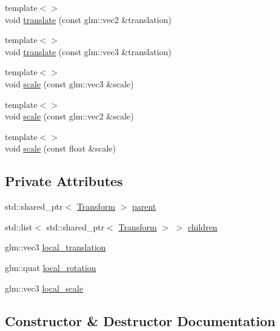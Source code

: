 \begin{DoxyCompactItemize}
{\footnotesize template$<$$>$ }\\void \hyperlink{class_transform_aa32a94ec80690e270a849b0ae0fd9230}{translate} (const glm\+::vec2 \&translation)
\item 
{\footnotesize template$<$$>$ }\\void \hyperlink{class_transform_af72de2343b28c920935e085a369618f7}{translate} (const glm\+::vec3 \&translation)
\item 
{\footnotesize template$<$$>$ }\\void \hyperlink{class_transform_a80a0d4e1e53facf0576af6c7c0d7b3fe}{scale} (const glm\+::vec3 \&scale)
\item 
{\footnotesize template$<$$>$ }\\void \hyperlink{class_transform_ae246427e89c5a775fbb4981078410e29}{scale} (const glm\+::vec2 \&scale)
\item 
{\footnotesize template$<$$>$ }\\void \hyperlink{class_transform_a602ccc5ef9e53683bb7b9c6a4580f680}{scale} (const float \&scale)
\end{DoxyCompactItemize}
\subsection*{Private Attributes}
\begin{DoxyCompactItemize}
\item 
std\+::shared\+\_\+ptr$<$ \hyperlink{class_transform}{Transform} $>$ \hyperlink{class_transform_a71f8820c3ef3bd92f681bc92d200548f}{parent}
\item 
std\+::list$<$ std\+::shared\+\_\+ptr$<$ \hyperlink{class_transform}{Transform} $>$ $>$ \hyperlink{class_transform_a22f8ebd97bc4ab75e133d0490d88e240}{children}
\item 
glm\+::vec3 \hyperlink{class_transform_a9cab8178cfc03757f96fb805d3725a2f}{local\+\_\+translation}
\item 
glm\+::quat \hyperlink{class_transform_a363d6f26cde024731741bdfcafd77777}{local\+\_\+rotation}
\item 
glm\+::vec3 \hyperlink{class_transform_adc17f89af50a97d875020e34e2b1ca3d}{local\+\_\+scale}
\end{DoxyCompactItemize}


\subsection{Constructor \& Destructor Documentation}
\hypertarget{class_transform_aa08ca4266efabc768973cdeea51945ab}{}
